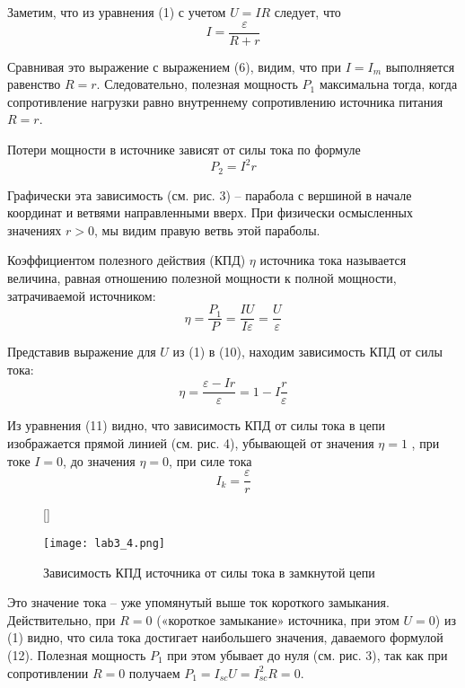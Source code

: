 \documentclass[12pt, a4paper]{article}
\begin{document}
Заметим, что из уравнения (1) с учетом $U = IR$ следует, что
\begin{equation}
I = \frac{\varepsilon}{R + r}
\end{equation}

Сравнивая это выражение с выражением (6), видим, что при $I = I_m$ выполняется
равенство $R = r$. Следовательно, полезная мощность $P_1$ максимальна тогда,
когда сопротивление нагрузки равно внутреннему сопротивлению источника
питания $R = r$.

Потери мощности в источнике зависят от силы тока по формуле
\begin{equation}
P_2 = I^2r
\end{equation}

Графически эта зависимость (см. рис. 3) – парабола с вершиной в начале
координат и ветвями направленными вверх. При физически осмысленных
значениях $r > 0$, мы видим правую ветвь этой параболы.

Коэффициентом полезного действия (КПД) $\eta$ источника тока называется
величина, равная отношению полезной мощности к полной мощности,
затрачиваемой источником:
\begin{equation}
\eta = \frac{P_1}{P} = \frac{IU}{I\varepsilon} = \frac{U}{\varepsilon}
\end{equation}

Представив выражение для $U$ из (1) в (10), находим зависимость КПД от силы тока:
\begin{equation}
\eta = \frac{\varepsilon - Ir}{\varepsilon} = 1 - I\frac{r}{\varepsilon}
\end{equation}

Из уравнения (11) видно, что зависимость КПД от силы тока в цепи
изображается прямой линией (см. рис. 4), убывающей от значения $\eta = 1$ , при
токе $I = 0$, до значения $\eta = 0$, при силе тока
\begin{equation}
I_k = \frac{\varepsilon}{r}
\end{equation}

\begin{figure}[H]
[\FBwidth]
{\caption{Зависимость КПД источника от силы тока в замкнутой цепи}}
{\texttt{[image: lab3\_4.png]}}
\end{figure}

Это значение тока – уже упомянутый выше ток короткого замыкания.
Действительно, при $R = 0$ («короткое замыкание» источника, при этом $U = 0$) из
(1) видно, что сила тока достигает наибольшего значения, даваемого формулой
(12). Полезная мощность $P_1$ при этом убывает до нуля (см. рис. 3), так как при
сопротивлении $R = 0$ получаем $P_1 = I_{sc}U = I_{sc}^2R = 0$.
\end{document}
